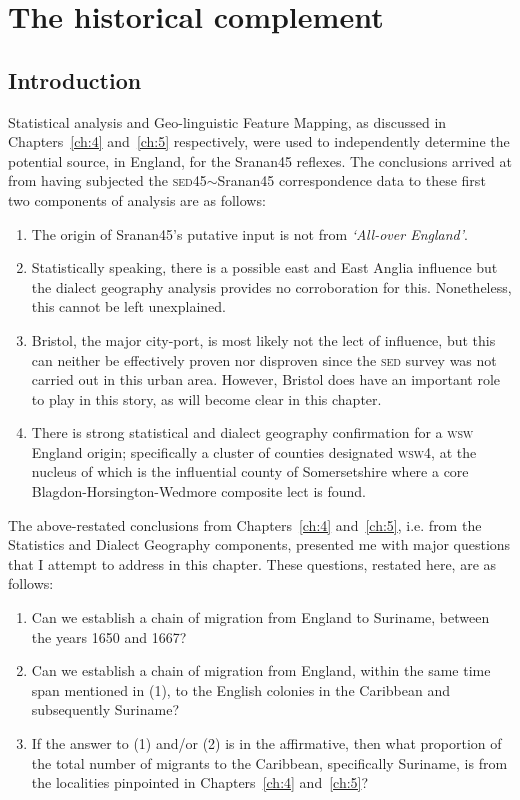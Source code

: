 \chapter{The historical complement}\label{ch:6}

\section{Introduction}\label{6.1}
Statistical analysis and Geo-linguistic Feature Mapping, as discussed in Chapters~\ref{ch:4} and~\ref{ch:5} respectively, were used to independently determine the potential source, in England, for the Sranan45 reflexes. The conclusions arrived at from having subjected the \textsc{sed45}$\sim$Sranan45 correspondence data to these first two components of analysis are as follows:

\renewcommand{\labelenumii}{\theenumi}
\begin{enumerate}
\item {The origin of Sranan45's putative input is not from \emph{`All-over England'}.}
\item  {Statistically speaking, there is a possible east and East Anglia influence but the dialect geography analysis provides no corroboration for this. Nonetheless, this cannot be left unexplained.}
\item {Bristol, the major city-port, is most likely not the lect of influence, but this can neither be effectively proven nor disproven since the \textsc{sed} survey was not carried out in this urban area. However, Bristol does have an important role to play in this story, as will become clear in this chapter.}
\item {There is strong statistical and dialect geography confirmation for a \textsc{wsw} England origin; specifically a cluster of counties designated  \textsc{wsw4}, at the nucleus of which is the influential county of Somersetshire where a core Blagdon-Horsington-Wedmore composite lect is found.}
\end{enumerate}

The above-restated conclusions from Chapters~\ref{ch:4} and~\ref{ch:5}, i.e. from the Statistics and Dialect Geography components, presented me with major questions that I attempt to address in this chapter. These questions, restated here, are as follows:


\begin{enumerate}
\item {Can we establish a chain of migration from England to Suriname, between the years 1650 and 1667?}
\item  {Can we establish a chain of migration from England, within the same time span mentioned in (1), to the English colonies in the Caribbean and subsequently Suriname?}
\item {If the answer to (1) and/or (2) is in the affirmative, then what proportion of the total number of migrants to the Caribbean, specifically Suriname, is from the localities pinpointed in Chapters~\ref{ch:4} and~\ref{ch:5}?}
\end{enumerate}


